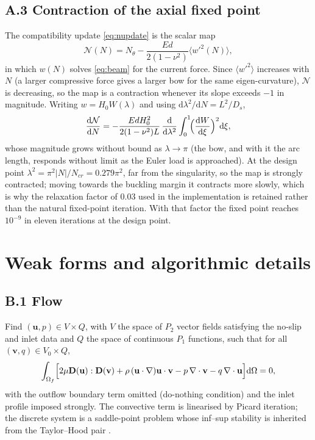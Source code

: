 \documentclass[11pt,a4paper]{article}
\newcommand{\bu}{\mathbf u}
\newcommand{\Om}{\Omega}
\newcommand{\D}{\mathbf D}
\newcommand{\dd}{\mathrm{d}}
\begin{document}
\subsection*{A.3 Contraction of the axial fixed point}

The compatibility update \eqref{eq:nupdate} is the scalar map
\begin{equation}
\mathcal{N}(N)=N_\theta-\frac{Ed}{2(1-\nu^2)}\bigl\langle w'^2(N)\bigr\rangle ,
\label{eq:appmap}
\end{equation}
in which $w(N)$ solves \eqref{eq:beam} for the current force. Since
$\langle w'^2\rangle$ increases with $N$ (a larger compressive force gives a
larger bow for the same eigen-curvature), $\mathcal{N}$ is decreasing, so the
map is a contraction whenever its slope exceeds $-1$ in magnitude. Writing
$w=H_0W(\lambda)$ and using $\dd\lambda^2/\dd N=L^2/D_s$,
\begin{equation}
\frac{\dd\mathcal{N}}{\dd N}
=-\frac{E d H_0^2}{2(1-\nu^2)L}\,\frac{\dd}{\dd\lambda^2}
\int_0^1\!\Bigl(\frac{\dd W}{\dd\xi}\Bigr)^2\dd\xi ,
\label{eq:appslope}
\end{equation}
whose magnitude grows without bound as $\lambda\to\pi$ (the bow, and with it
the arc length, responds without limit as the Euler load is approached). At
the design point $\lambda^2=\pi^2|N|/N_{cr}=0.279\pi^2$, far from the
singularity, so the map is strongly contracted; moving towards the buckling
margin it contracts more slowly, which is why the relaxation factor of $0.03$
used in the implementation is retained rather than the natural fixed-point
iteration. With that factor the fixed point reaches $10^{-9}$ in eleven
iterations at the design point.

\section{Weak forms and algorithmic details}
\label{app:weak}

\subsection*{B.1 Flow}

Find $(\bu,p)\in V\times Q$, with $V$ the space of $P_2$ vector fields
satisfying the no-slip and inlet data and $Q$ the space of continuous $P_1$
functions, such that for all $(\mathbf v,q)\in V_0\times Q$,
\begin{equation}
\int_{\Om_f}\Bigl[2\mu\D(\bu):\D(\mathbf v)
+\rho\,(\bu\cdot\nabla)\bu\cdot\mathbf v-p\,\nabla\cdot\mathbf v
-q\,\nabla\cdot\bu\Bigr]\dd\Om=0,
\label{eq:weakflow}
\end{equation}
with the outflow boundary term omitted (do-nothing condition) and the inlet
profile imposed strongly. The convective term is linearised by Picard
iteration; the discrete system is a saddle-point problem whose inf--sup
stability is inherited from the Taylor--Hood pair
\citep{brezzi1991mixed,hood1974navier}.
\end{document}
